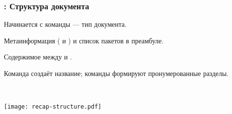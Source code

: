\documentclass[usenames,dvipsnames]{beamer}
\begin{document}
\begin{frame}[fragile]
\frametitle{\insertsection: Структура документа}
\vspace{-3ex}
\begin{itemize}{\small
\item Начинается с команды  --- тип документа.
\item Метаинформация ( и ) и список пакетов в преамбуле.
\item Содержимое между  и .
\item Команда  создаёт название; команды 
формируют пронумерованные разделы.
}\end{itemize}
\vspace{-4ex}
\begin{minipage}{0.55\linewidth}
\end{minipage}~~%
\begin{minipage}{0.45\linewidth}
\texttt{[image: recap-structure.pdf]}
\end{minipage}
\end{frame}
\end{document}
